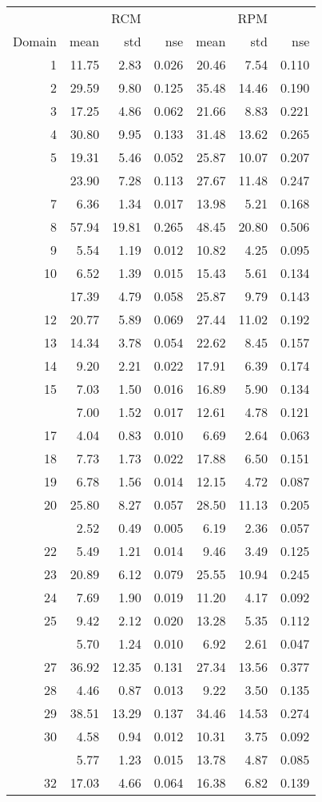 
\begin{tabular}[t]{rrrrrrr}
\toprule
\multicolumn{1}{c}{ } & \multicolumn{3}{c}{RCM} & \multicolumn{3}{c}{RPM} \\
\cmidrule(l{3pt}r{3pt}){2-4} \cmidrule(l{3pt}r{3pt}){5-7}
Domain & mean & std & nse & mean & std & nse\\
\midrule
1 & 11.75 & 2.83 & 0.026 & 20.46 & 7.54 & 0.110\\
2 & 29.59 & 9.80 & 0.125 & 35.48 & 14.46 & 0.190\\
3 & 17.25 & 4.86 & 0.062 & 21.66 & 8.83 & 0.221\\
4 & 30.80 & 9.95 & 0.133 & 31.48 & 13.62 & 0.265\\
5 & 19.31 & 5.46 & 0.052 & 25.87 & 10.07 & 0.207\\
\addlinespace
6 & 23.90 & 7.28 & 0.113 & 27.67 & 11.48 & 0.247\\
7 & 6.36 & 1.34 & 0.017 & 13.98 & 5.21 & 0.168\\
8 & 57.94 & 19.81 & 0.265 & 48.45 & 20.80 & 0.506\\
9 & 5.54 & 1.19 & 0.012 & 10.82 & 4.25 & 0.095\\
10 & 6.52 & 1.39 & 0.015 & 15.43 & 5.61 & 0.134\\
\addlinespace
11 & 17.39 & 4.79 & 0.058 & 25.87 & 9.79 & 0.143\\
12 & 20.77 & 5.89 & 0.069 & 27.44 & 11.02 & 0.192\\
13 & 14.34 & 3.78 & 0.054 & 22.62 & 8.45 & 0.157\\
14 & 9.20 & 2.21 & 0.022 & 17.91 & 6.39 & 0.174\\
15 & 7.03 & 1.50 & 0.016 & 16.89 & 5.90 & 0.134\\
\addlinespace
16 & 7.00 & 1.52 & 0.017 & 12.61 & 4.78 & 0.121\\
17 & 4.04 & 0.83 & 0.010 & 6.69 & 2.64 & 0.063\\
18 & 7.73 & 1.73 & 0.022 & 17.88 & 6.50 & 0.151\\
19 & 6.78 & 1.56 & 0.014 & 12.15 & 4.72 & 0.087\\
20 & 25.80 & 8.27 & 0.057 & 28.50 & 11.13 & 0.205\\
\addlinespace
21 & 2.52 & 0.49 & 0.005 & 6.19 & 2.36 & 0.057\\
22 & 5.49 & 1.21 & 0.014 & 9.46 & 3.49 & 0.125\\
23 & 20.89 & 6.12 & 0.079 & 25.55 & 10.94 & 0.245\\
24 & 7.69 & 1.90 & 0.019 & 11.20 & 4.17 & 0.092\\
25 & 9.42 & 2.12 & 0.020 & 13.28 & 5.35 & 0.112\\
\addlinespace
26 & 5.70 & 1.24 & 0.010 & 6.92 & 2.61 & 0.047\\
27 & 36.92 & 12.35 & 0.131 & 27.34 & 13.56 & 0.377\\
28 & 4.46 & 0.87 & 0.013 & 9.22 & 3.50 & 0.135\\
29 & 38.51 & 13.29 & 0.137 & 34.46 & 14.53 & 0.274\\
30 & 4.58 & 0.94 & 0.012 & 10.31 & 3.75 & 0.092\\
\addlinespace
31 & 5.77 & 1.23 & 0.015 & 13.78 & 4.87 & 0.085\\
32 & 17.03 & 4.66 & 0.064 & 16.38 & 6.82 & 0.139\\
\bottomrule
\end{tabular}
